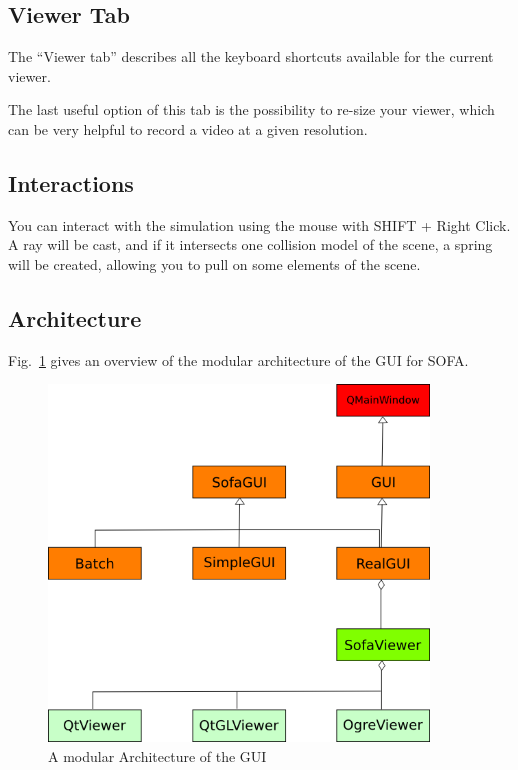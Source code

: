 \subsection{Viewer Tab}
The ``Viewer tab'' describes all the keyboard shortcuts available for the current viewer.

The last useful option of this tab is the possibility to re-size your viewer, which can be very helpful to record a video at a given resolution.









\subsection{Interactions}
You can interact with the simulation using the mouse with SHIFT + Right Click. A ray will be cast, and if it intersects one collision model of the scene, a spring will be created, allowing you to pull on some elements of the scene.



\newpage
\subsection{Architecture}
Fig.~\ref{fig:GUI_UML} gives an overview of the modular architecture of the GUI for SOFA. 
\begin{figure}[htpb]
	\centering
		\includegraphics[width=0.9\textwidth]{GUI/GUI_UML.png}
	\caption{A modular Architecture of the GUI}
 	\label{fig:GUI_UML}
\end{figure}








